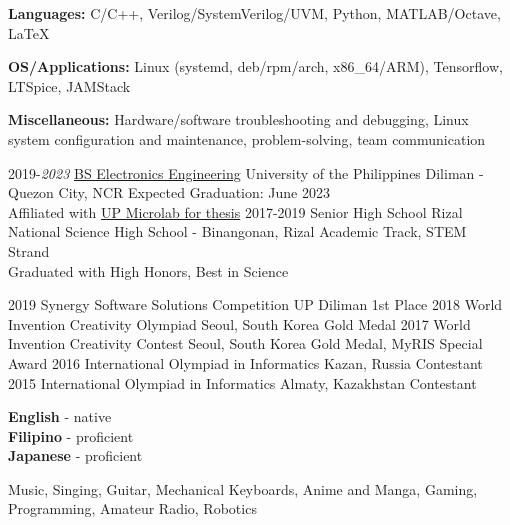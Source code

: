 \documentclass[9pt]{developercv}
\begin{document}
\begin{minipage}[t]{0.475\textwidth} 
	\vspace{-\baselineskip}


	\textbf{Languages:} C/C++, Verilog/SystemVerilog/UVM, Python, MATLAB/Octave, LaTeX

	\textbf{OS/Applications:} Linux (systemd, deb/rpm/arch, x86\_64/ARM), Tensorflow, LTSpice, JAMStack

	\textbf{Miscellaneous:} Hardware/software troubleshooting and debugging, Linux system configuration and maintenance, problem-solving, team communication

	
	\begin{entrylist}
		\entry
			{2019-\emph{2023}}
			{\href{https://www.eee.upd.edu.ph/undergraduate-programs/bs-electronics-and-communications-engineering}{BS Electronics Engineering}}
			{University of the Philippines Diliman - Quezon City, NCR}
			{Expected Graduation: June 2023\\
			Affiliated with \href{https://www.up-microlab.org/}{UP Microlab for thesis}}
		\entry
			{2017-2019}
			{Senior High School}
			{Rizal National Science High School - Binangonan, Rizal}
			{Academic Track, STEM Strand\\
			Graduated with High Honors, Best in Science}
	\end{entrylist}
	\cvsect{Achievements}
	\begin{entrylist}
		\entry
			{2019}
			{Synergy Software Solutions Competition}
			{UP Diliman}
			{1st Place}
		\entry
			{2018}
			{World Invention Creativity Olympiad}
			{Seoul, South Korea}
			{Gold Medal}
		\entry
			{2017}
			{World Invention Creativity Contest}
			{Seoul, South Korea}
			{Gold Medal, MyRIS Special Award}
		\entry
			{2016}
			{International Olympiad in Informatics}
			{Kazan, Russia}
			{Contestant}
		\entry
			{2015}
			{International Olympiad in Informatics}
			{Almaty, Kazakhstan}
			{Contestant}
	\end{entrylist}
\end{minipage}

\vspace{0.5cm}

\begin{minipage}[t]{0.2\textwidth}
	\vspace{-\baselineskip}

	\textbf{English} - native\\
	\textbf{Filipino} - proficient\\
	\textbf{Japanese} - proficient\\
\end{minipage}
\hfill
\begin{minipage}[t]{0.6\textwidth}
	\vspace{-\baselineskip}
	
	Music, Singing, Guitar, Mechanical Keyboards, Anime and Manga, Gaming, Programming, Amateur Radio, Robotics
\end{minipage}
\end{document}
